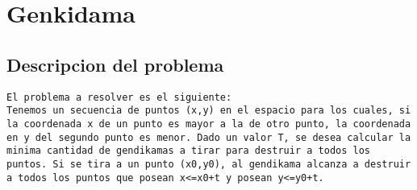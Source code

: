 \documentclass[10pt,a4paper]{article}
\begin{document}

\section{Genkidama}

\subsection{Descripcion del problema}
\begin{verbatim}
El problema a resolver es el siguiente:
Tenemos un secuencia de puntos (x,y) en el espacio para los cuales, si la coordenada x de un punto es mayor a la de otro punto, la coordenada en y del segundo punto es menor. Dado un valor T, se desea calcular la minima cantidad de gendikamas a tirar para destruir a todos los puntos. Si se tira a un punto (x0,y0), al gendikama alcanza a destruir a todos los puntos que posean x<=x0+t y posean y<=y0+t.
\end{verbatim}
\end{document}
